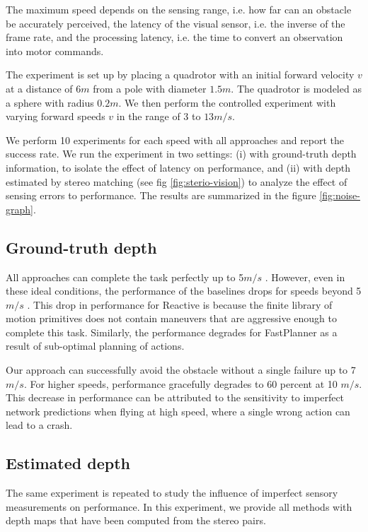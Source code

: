 The
maximum speed depends on the sensing range, i.e. how far can an
obstacle be accurately perceived, the latency of the visual sensor, i.e.
the inverse of the frame rate, and the processing latency, i.e. the time
to convert an observation into motor commands. 

The experiment is set up by placing a quadrotor with an initial
forward velocity $v$ at a distance of $6 m$ from a pole with diameter $1.5 m$.
The quadrotor is modeled as a sphere with radius $0.2 m$. We then perform the controlled experiment with varying
forward speeds $v$ in the range of 3 to $13 m/s$.

We perform 10
experiments for each speed with all approaches and report the success
rate. We run the experiment in two settings: (i) with ground-truth depth
information, to isolate the effect of latency on performance, and (ii)
with depth estimated by stereo matching \cite{stereoMatching} (see fig \ref{fig:sterio-vision}) to analyze the effect of
sensing errors to performance.
The results are summarized in the figure \ref{fig:noise-graph}.

\subsection{Ground-truth depth}

All approaches can complete the
task perfectly up to 5$m/s$ . However, even in these ideal conditions,
the performance of the baselines drops for speeds beyond 5$m/s$ . This
drop in performance for Reactive \cite{reactive_method} is because the
finite library of motion primitives does not contain maneuvers that are aggressive enough to complete this task. Similarly, the performance
degrades for FastPlanner \cite{fastPlanner} as a result of sub-optimal planning of actions.

Our approach can successfully avoid the obstacle without a
single failure up to 7 $m/s$. For higher speeds, performance gracefully degrades to 60 percent at 10 $m/s$. This decrease in performance can
be attributed to the sensitivity to imperfect network predictions when
flying at high speed, where a single wrong action can lead to a crash.

\subsection{Estimated depth}
The same experiment is repeated to study the influence of imperfect sensory measurements on performance. In this experiment, we provide all methods with depth maps that have been computed from
the stereo pairs.  

